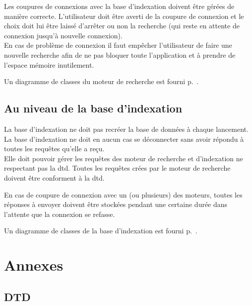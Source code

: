 \documentclass[a4paper,12pt]{report}
\begin{document}
Les coupures de connexions avec la base d'indexation doivent être gérées de manière correcte. L'utilisateur doit être averti de la coupure de connexion et le choix doit lui être laissé d'arrêter ou non la recherche (qui reste en attente de connexion jusqu'à nouvelle connexion).\\
En cas de problème de connexion il faut empêcher l'utilisateur de faire une nouvelle recherche afin de ne pas bloquer toute l'application et à prendre de l'espace mémoire inutilement.

Un diagramme de classes du moteur de recherche est fourni p.~\pageref{diagramme_classes_mr}.

\section{Au niveau de la base d'indexation}
La base d'indexation ne doit pas recréer la base de données à chaque lancement.\\
La base d'indexation ne doit en aucun cas se déconnecter sans avoir répondu à toutes les requêtes qu'elle a reçu.\\
Elle doit pouvoir gérer les requêtes des moteur de recherche et d'indexation ne respectant pas la \gls{dtd}. Toutes les requêtes crées par le moteur de recherche doivent être conforment à la \gls{dtd}.

En cas de coupure de connexion avec un (ou plusieurs) des moteurs, toutes les réponses à envoyer doivent être stockées pendant une certaine durée dans l'attente que la connexion se refasse.

Un diagramme de classes de la base d'indexation est fourni p.~\pageref{diagramme_classes_bi}.

\chapter{Annexes}

\section{DTD}\label{dtd}
\end{document}
